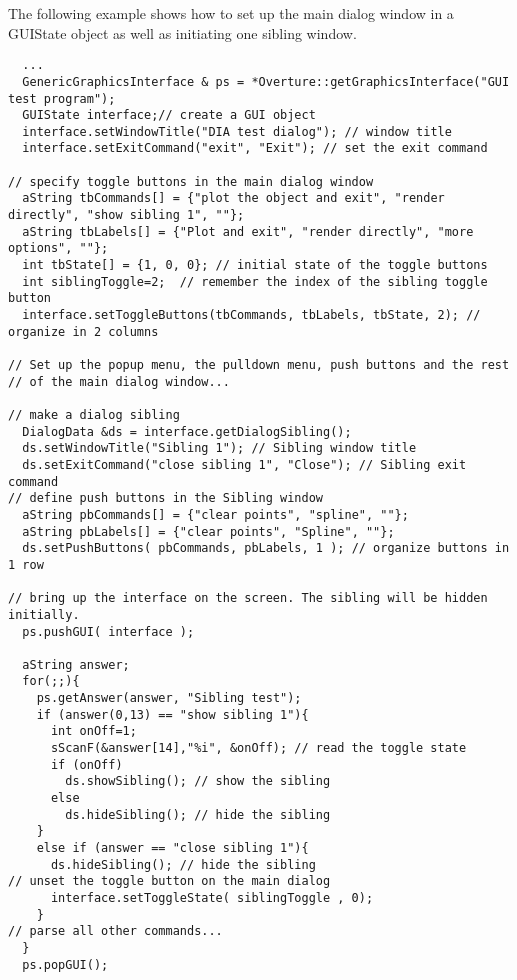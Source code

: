 \documentclass{article}
\begin{document}
The following example shows how to set up the main dialog window in 
a GUIState object as well as initiating one sibling window.
\begin{verbatim}
  ... 
  GenericGraphicsInterface & ps = *Overture::getGraphicsInterface("GUI test program"); 
  GUIState interface;// create a GUI object
  interface.setWindowTitle("DIA test dialog"); // window title
  interface.setExitCommand("exit", "Exit"); // set the exit command  

// specify toggle buttons in the main dialog window
  aString tbCommands[] = {"plot the object and exit", "render directly", "show sibling 1", ""};
  aString tbLabels[] = {"Plot and exit", "render directly", "more options", ""};
  int tbState[] = {1, 0, 0}; // initial state of the toggle buttons
  int siblingToggle=2;  // remember the index of the sibling toggle button
  interface.setToggleButtons(tbCommands, tbLabels, tbState, 2); // organize in 2 columns

// Set up the popup menu, the pulldown menu, push buttons and the rest
// of the main dialog window...
  
// make a dialog sibling
  DialogData &ds = interface.getDialogSibling();
  ds.setWindowTitle("Sibling 1"); // Sibling window title
  ds.setExitCommand("close sibling 1", "Close"); // Sibling exit command 
// define push buttons in the Sibling window
  aString pbCommands[] = {"clear points", "spline", ""};
  aString pbLabels[] = {"clear points", "Spline", ""};
  ds.setPushButtons( pbCommands, pbLabels, 1 ); // organize buttons in 1 row

// bring up the interface on the screen. The sibling will be hidden initially.
  ps.pushGUI( interface );

  aString answer;
  for(;;){
    ps.getAnswer(answer, "Sibling test");
    if (answer(0,13) == "show sibling 1"){
      int onOff=1;
      sScanF(&answer[14],"%i", &onOff); // read the toggle state
      if (onOff)
        ds.showSibling(); // show the sibling
      else
        ds.hideSibling(); // hide the sibling
    }
    else if (answer == "close sibling 1"){
      ds.hideSibling(); // hide the sibling
// unset the toggle button on the main dialog
      interface.setToggleState( siblingToggle , 0);
    }
// parse all other commands...
  }
  ps.popGUI();
\end{verbatim}



\vfill\eject
\end{document}
